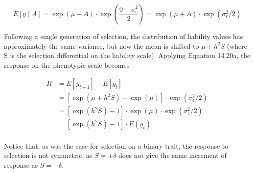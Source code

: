\documentclass{article}
\begin{document}
\begin{equation}
E[y\mid A]=\exp(\mu+A)\cdot\exp\left(\frac{0+\sigma_{e}^{2}}{2}\right)=\exp(\mu+A)\cdot\exp(\sigma_{e}^{2}/2)
\tag{14.20b}
\label{eq:14_20b}
\end{equation}

Following a single generation of selection, the distribution of liability values has approximately the same variance, but now the mean is shifted to  $ \mu + h^{2}S $ (where S is the selection differential on the liability scale). Applying Equation 14.20a, the response on the phenotypic scale becomes

\begin{equation}
\begin{aligned}R&=E[y_{t+1}]-E[y_{t}]\\&=\left[\exp(\mu+h^{2}S)-\exp(\mu)\right]\cdot\exp(\sigma_{z}^{2}/2)\\&=\left[\exp(h^{2}S)-1\right]\cdot\exp(\mu)\cdot\exp(\sigma_{z}^{2}/2)\\&=\left[\exp(h^{2}S)-1\right]\cdot E(y_{t})\\ \end{aligned}
\tag{14.21}
\label{eq:14_21}
\end{equation}

Notice that, as was the case for selection on a binary trait, the response to selection is not symmetric, as  $ S = +\delta $ does not give the same increment of response as  $ S = -\delta $.
\end{document}
